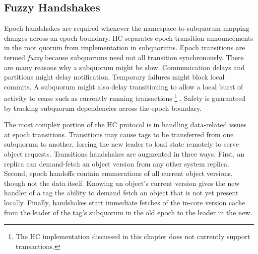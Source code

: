\subsection{Fuzzy Handshakes}
\label{ch03_fuzzy_transitions}

Epoch handshakes are required whenever the namespace-to-subquorum mapping changes across an epoch boundary.
HC separates epoch transition announcements in the root quorum from implementation in subquorums.
Epoch transitions are termed \emph{fuzzy} because subquorums need not all transition synchronously.
There are many reasons why a subquorum might be slow.
Communication delays and partitions might delay notification.
Temporary failures might block local commits.
A subquorum might also delay transitioning to allow a local burst of activity to cease such as currently running transactions\renewcommand{\baselinestretch}{1} \small\footnotesize\footnote{The HC implementation discussed in this chapter does not currently support transactions.}\renewcommand{\baselinestretch}{2} \small\normalsize.
Safety is guaranteed by tracking subquorum dependencies across the epoch boundary.

The most complex portion of the HC protocol is in handling data-related issues at epoch transitions.
Transitions may cause tags to be transferred from one subquorum to another, forcing the new leader to load state remotely to serve object requests.
Transitions handshakes are augmented in three ways.
First, an replica can demand-fetch an object version from any other system replica.
Second, epoch handoffs contain enumerations of all current object versions, though not the data itself.
Knowing an object's current version gives the new handler of a tag the ability to demand fetch an object that is not yet present locally.
Finally, handshakes start immediate fetches of the in-core version cache from the leader of the tag's subquorum in the old epoch to the leader in the new.

